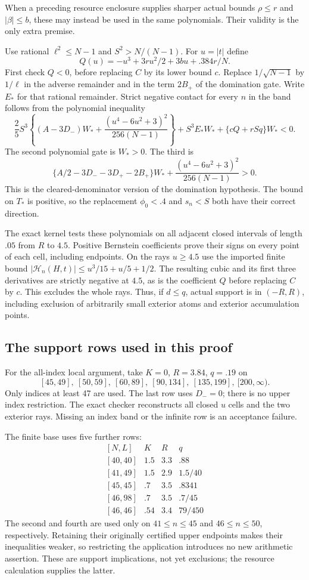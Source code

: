 \documentclass[11pt,a4paper]{article}
\numberwithin{equation}{section}
\theoremstyle{definition}
\theoremstyle{remark}
\begin{document}
When a preceding resource enclosure supplies sharper actual bounds
$\rho\le r$ and $|\beta|\le b$, these may instead be used in the
same polynomials. Their validity is the only extra premise.

Use rational $\ell^2\le N-1$ and $S^2>N/(N-1)$. For $u=|t|$ define
\[
 Q(u)=-u^3+3ru^2/2+3bu+.384r/N.
\]
First check $Q<0$, before replacing $C$ by its lower bound $c$.
Replace $1/\sqrt{N-1}$ by $1/\ell$ in the adverse remainder and in
the term $2B_+$ of the domination gate. Write $E_*$ for that rational
remainder. Strict negative contact for every $n$ in the band follows
from the polynomial inequality
\[
 \frac25S^3\left\{(A-3D_-)W_*+
              \frac{(u^4-6u^2+3)^2}{256(N-1)}\right\}
 +S^3E_*W_*+\{cQ+rSq\}W_*<0.
\]
The second polynomial gate is $W_*>0$. The third is
\[
 \{A/2-3D_--3D_+-2B_+\}W_*+
         \frac{(u^4-6u^2+3)^2}{256(N-1)}>0.
\]
This is the cleared-denominator version of the domination hypothesis.
The bound on $T_*$ is positive, so the replacement $\phi_0<.4$ and
$s_n<S$ both have their correct direction.

The exact kernel tests these polynomials on all adjacent closed intervals
of length $.05$ from $R$ to $4.5$. Positive Bernstein coefficients prove
their signs on every point of each cell, including endpoints. On the
rays $u\ge4.5$ use the imported finite bound
$|\mathcal H_n(H,t)|\le u^3/15+u/5+1/2$.
The resulting cubic and its first three derivatives are strictly negative
at $4.5$, as is the coefficient $Q$ before replacing $C$ by $c$.
This excludes the whole rays. Thus, if $d\le q$, actual support is in
$(-R,R)$, including exclusion of arbitrarily small exterior atoms and
exterior accumulation points.

\subsection{The support rows used in this proof}
For the all-index local argument, take $K=0$, $R=3.84$, $q=.19$ on
\[
[45,49],\ [50,59],\ [60,89],\ [90,134],\ [135,199],\ [200,\infty).
\]
Only indices at least 47 are used. The last row uses $D_-=0$;
there is no upper index restriction. The exact checker reconstructs
all closed $u$ cells and the two exterior rays. Missing an index band
or the infinite row is an acceptance failure.

The finite base uses five further rows:
\[
\begin{array}{c|c|c|c}
[N,L]&K&R&q\\\hline
{[40,40]}&1.5&3.3&.88\\
{[41,49]}&1.5&2.9&1.5/40\\
{[45,45]}&.7&3.5&.8341\\
{[46,98]}&.7&3.5&.7/45\\
{[46,46]}&.54&3.4&79/450
\end{array}
\]
The second and fourth are used only on $41\le n\le45$ and
$46\le n\le50$, respectively. Retaining their originally certified
upper endpoints makes their inequalities weaker, so restricting the
application introduces no new arithmetic assertion. These are support
implications, not yet exclusions; the resource calculation supplies
the latter.
\end{document}
